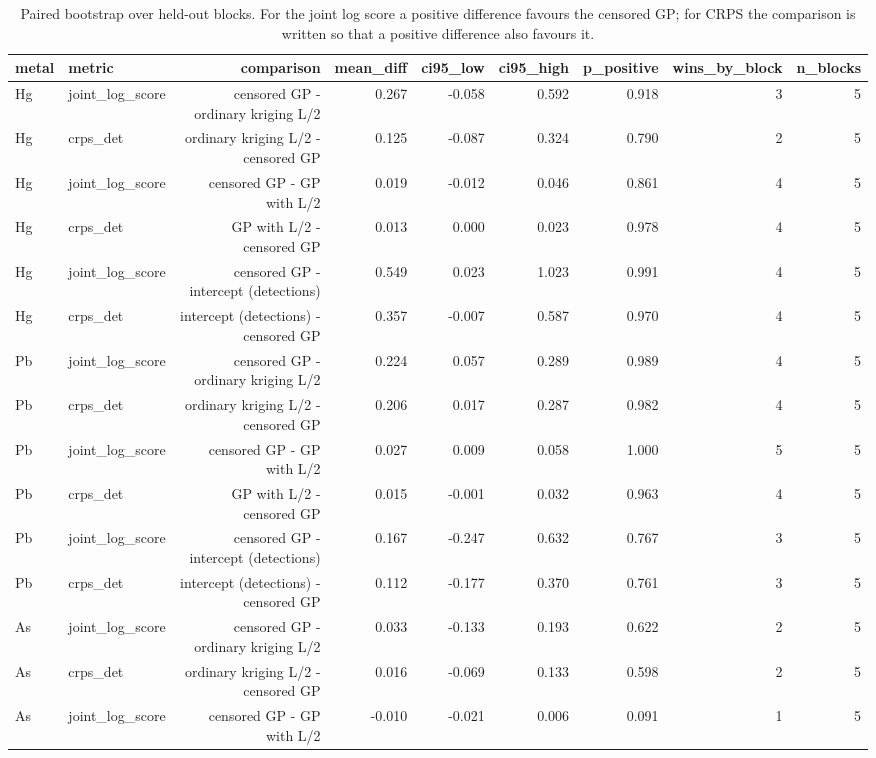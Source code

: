 \begin{table}[htbp]
\centering
\caption{Paired bootstrap over held-out blocks. For the joint log score a positive difference favours the censored GP; for CRPS the comparison is written so that a positive difference also favours it.}
\label{tab:bootstrap}
\footnotesize
\begin{tabular}{llrrrrrrr}
\toprule
metal & metric & comparison & mean\_diff & ci95\_low & ci95\_high & p\_positive & wins\_by\_block & n\_blocks \\
\midrule
Hg & joint\_log\_score & censored GP - ordinary kriging L/2 & 0.267 & -0.058 & 0.592 & 0.918 & 3 & 5 \\
Hg & crps\_det & ordinary kriging L/2 - censored GP & 0.125 & -0.087 & 0.324 & 0.790 & 2 & 5 \\
Hg & joint\_log\_score & censored GP - GP with L/2 & 0.019 & -0.012 & 0.046 & 0.861 & 4 & 5 \\
Hg & crps\_det & GP with L/2 - censored GP & 0.013 & 0.000 & 0.023 & 0.978 & 4 & 5 \\
Hg & joint\_log\_score & censored GP - intercept (detections) & 0.549 & 0.023 & 1.023 & 0.991 & 4 & 5 \\
Hg & crps\_det & intercept (detections) - censored GP & 0.357 & -0.007 & 0.587 & 0.970 & 4 & 5 \\
Pb & joint\_log\_score & censored GP - ordinary kriging L/2 & 0.224 & 0.057 & 0.289 & 0.989 & 4 & 5 \\
Pb & crps\_det & ordinary kriging L/2 - censored GP & 0.206 & 0.017 & 0.287 & 0.982 & 4 & 5 \\
Pb & joint\_log\_score & censored GP - GP with L/2 & 0.027 & 0.009 & 0.058 & 1.000 & 5 & 5 \\
Pb & crps\_det & GP with L/2 - censored GP & 0.015 & -0.001 & 0.032 & 0.963 & 4 & 5 \\
Pb & joint\_log\_score & censored GP - intercept (detections) & 0.167 & -0.247 & 0.632 & 0.767 & 3 & 5 \\
Pb & crps\_det & intercept (detections) - censored GP & 0.112 & -0.177 & 0.370 & 0.761 & 3 & 5 \\
As & joint\_log\_score & censored GP - ordinary kriging L/2 & 0.033 & -0.133 & 0.193 & 0.622 & 2 & 5 \\
As & crps\_det & ordinary kriging L/2 - censored GP & 0.016 & -0.069 & 0.133 & 0.598 & 2 & 5 \\
As & joint\_log\_score & censored GP - GP with L/2 & -0.010 & -0.021 & 0.006 & 0.091 & 1 & 5 \\

\end{tabular}
\end{table}
